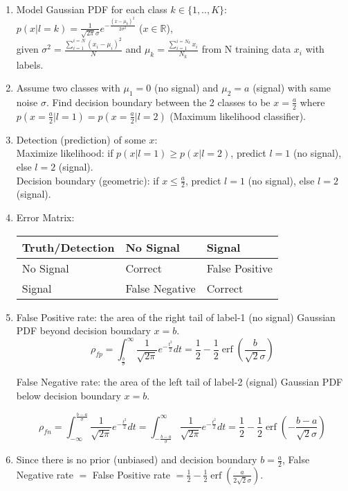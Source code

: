 \documentclass[11pt]{article}
\newcommand{\R}{\mathbb{R}}
\DeclareMathOperator{\erf}{erf}
\begin{document}
    \begin{enumerate}
    \item Model Gaussian PDF for each class $k \in \{1,..,K\}$:
    $p(x|l=k) = \frac{1}{\sqrt{2\pi}\sigma} e^{-\frac{{(x-\mu_k)}^2}{2\sigma^2}}$ ($x \in \R$),\\
    given $\sigma^2=\frac{\sum_{i=1}^{i=N} {(x_i-\mu_i)}^2}{N}$ and $\mu_k = \frac{\sum_{i=1}^{i=N_k} x_i}{N_k}$ from N training data $x_i$ with labels. 
    \item Assume two classes with $\mu_1 = 0$ (no signal) and $\mu_2 = a$ (signal) with same noise $\sigma$. Find decision boundary between the 2 classes to be $x=\frac{a}{2}$ where $p(x=\frac{a}{2}|l=1) = p(x=\frac{a}{2}|l=2)$ (Maximum likelihood classifier).
    \item Detection (prediction) of some $x$: \\
    Maximize likelihood: if $p(x|l=1) \ge p(x|l=2)$, predict $l=1$ (no signal), else $l=2$ (signal).\\
    Decision boundary (geometric): if $x \leq \frac{a}{2}$, predict $l=1$ (no signal), else $l=2$ (signal).
    \item Error Matrix:
    
    \begin{tabular}{l|l|l}
    Truth/Detection&No Signal&Signal\\\hline
    No Signal&Correct&False Positive\\\hline
    Signal&False Negative&Correct\\
    \end{tabular}
    \item False Positive rate: the area of the right tail of label-1 (no signal) Gaussian PDF beyond decision boundary $x=b$.
    \begin{equation}
        \rho_{fp} = \int_{\frac{b}{\sigma}}^{\infty} \frac{1}{\sqrt{2\pi}} e^{-\frac{t^2}{2}}dt = \frac{1}{2} - \frac{1}{2} \erf(\frac{b}{\sqrt{2}\sigma})
    \label{eq:1}
    \end{equation}
    
    False Negative rate: the area of the left tail of label-2 (signal) Gaussian PDF below decision boundary $x=b$.
    
    \begin{equation}
        \rho_{fn} = \int_{-\infty}^{\frac{b-a}{\sigma}} \frac{1}{\sqrt{2\pi}} e^{-\frac{t^2}{2}}dt = \int_{-\frac{b-a}{\sigma}}^{\infty} \frac{1}{\sqrt{2\pi}} e^{-\frac{t^2}{2}}dt = \frac{1}{2} - \frac{1}{2} \erf(-\frac{b-a}{\sqrt{2}\sigma})
    \label{eq:2}
    \end{equation}
    
    
    \item Since there is no prior (unbiased) and decision boundary $b=\frac{a}{2}$, False Negative rate $=$ False Positive rate $= \frac{1}{2} - \frac{1}{2} \erf(\frac{a}{2\sqrt{2}\sigma})$.
\end{enumerate}
\end{document}
